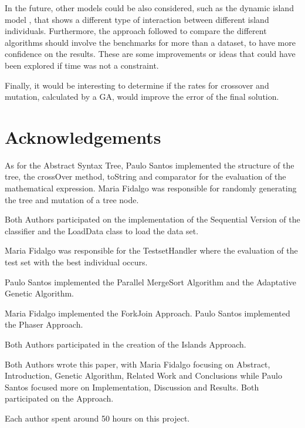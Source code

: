 \documentclass[runningheads]{llncs}
\begin{document}
In the future, other models could be also considered, such as the dynamic island model \cite{meng2017dynamic}, that shows a different type of interaction between different island individuals. Furthermore, the approach followed to compare the different algorithms should involve the benchmarks for more than a dataset, to have more confidence on the results. These are some improvements or ideas that could have been explored if time was not a constraint.

Finally, it would be interesting to determine if the rates for crossover and mutation, calculated by a GA, would  improve the error of the final solution.

\section*{Acknowledgements}

As for the Abstract Syntax Tree, Paulo Santos implemented the structure of the tree, the crossOver method, toString and comparator for the evaluation of the mathematical expression. Maria Fidalgo was responsible for randomly generating the tree and mutation of a tree node.

Both Authors participated on the implementation of the Sequential Version of the classifier and the LoadData class to load the data set.

Maria Fidalgo was responsible for the TestsetHandler where the evaluation of the test set with the best individual occurs.

Paulo Santos implemented the Parallel MergeSort Algorithm and the Adaptative Genetic Algorithm.

Maria Fidalgo implemented the ForkJoin Approach. Paulo Santos implemented the Phaser Approach.

Both Authors participated in the creation of the Islands Approach.

Both Authors wrote this paper, with Maria Fidalgo focusing on Abstract, Introduction, Genetic Algorithm, Related Work and Conclusions while Paulo Santos focused more on Implementation, Discussion and Results. Both participated on the Approach.

Each author spent around 50 hours on this project.



\end{document}
